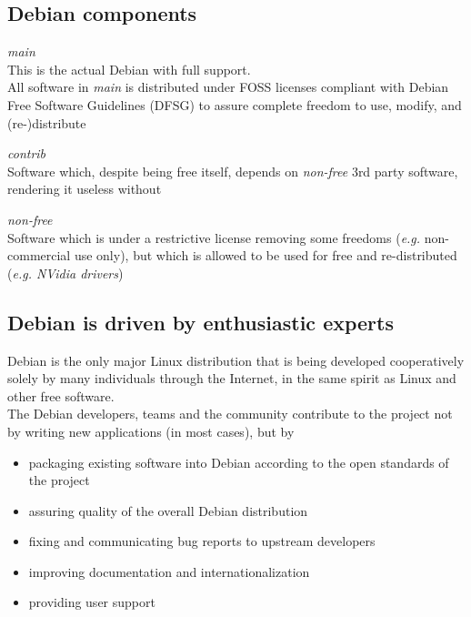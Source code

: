 \documentclass[letterpaper,landscape]{report}
\begin{document}
\begin{multicols}{3}
\subsection*{Debian components}


\begin{description}[nolistsep,leftmargin=1pc,topsep=1em]
\item[Free as in freedom]\hfill\emph{main}\\
  This is the actual Debian with full support.\\
  All software in \emph{main} is distributed under FOSS licenses
  compliant with Debian Free Software Guidelines (DFSG) to assure
  complete freedom to use, modify, and (re-)distribute
\item[Not free \emph{en bloc}]\hfill\emph{contrib}\\
  Software which, despite being free itself, depends on
  \emph{non-free} 3rd party software, rendering it useless without
\item[Somewhat free]\hfill\emph{non-free}\\
  Software which is under a restrictive license removing some freedoms
  (\emph{e.g.} non-commercial use only), but which is allowed to be
  used for free and re-distributed (\emph{e.g. NVidia drivers})
\end{description}


\subsection*{Debian is driven by enthusiastic experts}

Debian is the only major Linux distribution that is being developed
cooperatively solely by many individuals through the Internet, in the
same spirit as Linux and other free software.\\
The Debian developers, teams and the community contribute to the
project not by writing new applications (in most cases), but by
\begin{itemize}[nolistsep,leftmargin=1pc]
\item packaging existing software into Debian
  according to the open standards of the project
\item assuring quality of the overall Debian distribution
\item fixing and communicating bug reports to upstream developers
\item improving documentation and internationalization
\item providing user support
\end{itemize}


\end{multicols}
\end{document}
